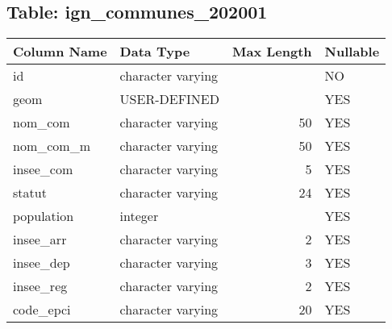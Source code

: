 \subsection*{Table: ign_communes_202001}
\begin{tabular}{llrl}
\hline
 Column Name   & Data Type         &   Max Length & Nullable   \\
\hline
 id            & character varying &              & NO         \\
 geom          & USER-DEFINED      &              & YES        \\
 nom_com       & character varying &           50 & YES        \\
 nom_com_m     & character varying &           50 & YES        \\
 insee_com     & character varying &            5 & YES        \\
 statut        & character varying &           24 & YES        \\
 population    & integer           &              & YES        \\
 insee_arr     & character varying &            2 & YES        \\
 insee_dep     & character varying &            3 & YES        \\
 insee_reg     & character varying &            2 & YES        \\
 code_epci     & character varying &           20 & YES        \\
\hline
\end{tabular}
